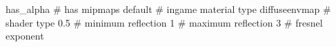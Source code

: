 has_alpha
# has mipmaps
default			 # ingame material type
diffuseenvmap            # shader type
0.5			 # minimum reflection
1			 # maximum reflection
3			 # fresnel exponent


